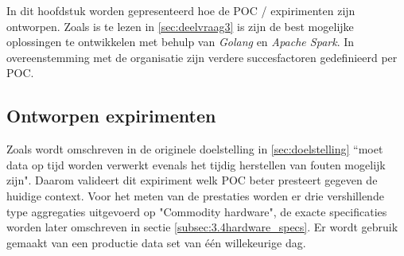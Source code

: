 


In dit hoofdstuk worden gepresenteerd hoe de POC / expirimenten zijn ontworpen. Zoals is te lezen in \ref{sec:deelvraag3} is zijn de best mogelijke oplossingen te ontwikkelen met behulp van \textit{Golang} en \textit{Apache Spark}. In overeenstemming met de organisatie zijn verdere succesfactoren gedefinieerd per POC.




\subsection{Ontworpen expirimenten}

Zoals wordt omschreven in de originele doelstelling in \ref{sec:doelstelling} ``moet data op tijd worden verwerkt evenals het tijdig herstellen van fouten mogelijk zijn".  Daarom valideert dit expiriment welk POC beter presteert gegeven de huidige context. Voor het meten van de prestaties worden er drie vershillende type aggregaties uitgevoerd op "Commodity hardware", de exacte specificaties worden later omschreven in sectie \ref{subsec:3.4hardware_specs}.  Er wordt gebruik gemaakt van een productie data set van één willekeurige dag.

